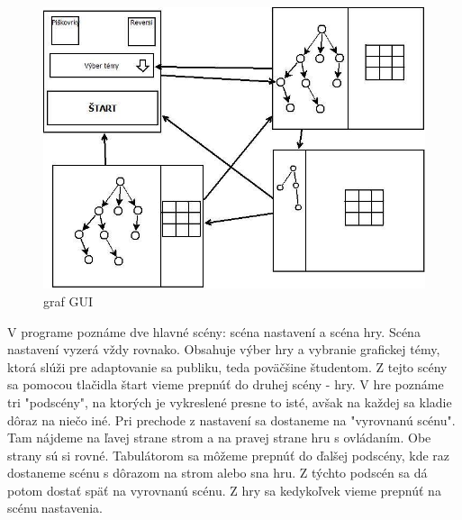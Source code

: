 \documentclass{article}
\begin{document}
\begin{figure}[H]
		\centering
		\includegraphics[width=\textwidth]{images/gui_graph-diagram.jpg}
		\caption{graf GUI}
		\label{fig:guigraph}
\end{figure}
V programe poznáme dve hlavné scény: scéna nastavení a scéna hry. Scéna nastavení vyzerá vždy rovnako. Obsahuje výber hry a vybranie grafickej témy, ktorá slúži pre adaptovanie sa publiku, teda poväčšine študentom. Z tejto scény sa pomocou tlačidla štart vieme prepnúť do druhej scény - hry. V hre poznáme tri "podscény", na ktorých je vykreslené presne to isté, avšak na každej sa kladie dôraz na niečo iné. Pri prechode z nastavení sa dostaneme na "vyrovnanú scénu". Tam nájdeme na ľavej strane strom a na pravej strane hru s ovládaním. Obe strany sú si rovné. Tabulátorom sa môžeme prepnúť do ďalšej podscény, kde raz dostaneme scénu s dôrazom na strom alebo sna hru. Z týchto podscén sa dá potom dostať späť na vyrovnanú scénu. Z hry sa kedykoľvek vieme prepnúť na scénu nastavenia.
\end{document}
